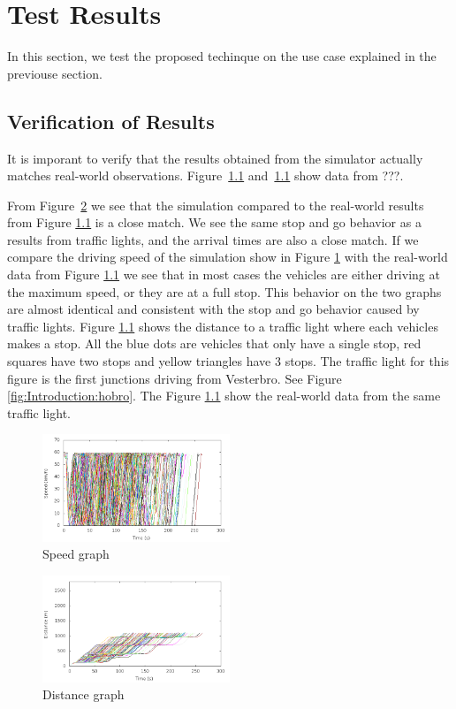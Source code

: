 \section{Test Results}
In this section, we test the proposed techinque on the use case explained in the previouse section.

\subsection{Verification of Results}
It is imporant to verify that the results obtained from the simulator actually matches real-world observations.
Figure~\ref{} and~\ref{} show data from ???.

From Figure~\ref{fig:TestResults:distance0} we see that the simulation compared to the real-world results from Figure \ref{} is a close match. 
We see the same stop and go behavior as a results from traffic lights, and the arrival times are also a close match. 
If we compare the driving speed of the simulation show in Figure \ref{fig:TestResults:speed0} with the real-world data from Figure \ref{} we see that in most cases the vehicles are either driving at the maximum speed, or they are at a full stop. 
This behavior on the two graphs are almost identical and consistent with the stop and go behavior caused by traffic lights. 
Figure \ref{} shows the distance to a traffic light where each vehicles makes a stop. 
All the blue dots are vehicles that only have a single stop, red squares have two stops and yellow triangles have 3 stops.
The traffic light for this figure is the first junctions driving from Vesterbro. See Figure \ref{fig:Introduction:hobro}. The Figure \ref{} show the real-world data from the same traffic light. 

\begin{figure}[htb]
\includegraphics[width=0.5\textwidth]{../images/tp0/speedUncontrolled0.png}
\caption{Speed graph}
\label{fig:TestResults:speed0}
\end{figure}

\begin{figure}[htb]
\includegraphics[width=0.5\textwidth]{../images/tp0/distanceUncontrolled0.png}
\caption{Distance graph}
\label{fig:TestResults:distance0}
\end{figure}

